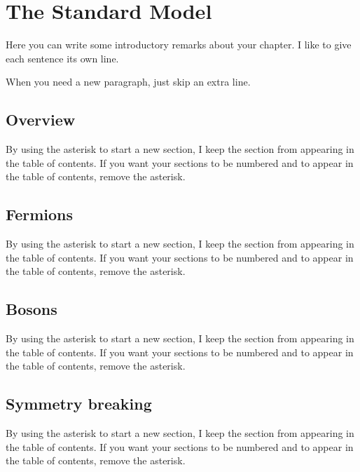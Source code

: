 

\chapter[The Standard Model][Top of Page Title]{The Standard Model}

Here you can write some introductory remarks about your chapter.
I like to give each sentence its own line.

When you need a new paragraph, just skip an extra line.

\section*{Overview}

By using the asterisk to start a new section, I keep the section from appearing in the table of contents.
If you want your sections to be numbered and to appear in the table of contents, remove the asterisk.


\section*{Fermions}

By using the asterisk to start a new section, I keep the section from appearing in the table of contents.
If you want your sections to be numbered and to appear in the table of contents, remove the asterisk.

\section*{Bosons}

By using the asterisk to start a new section, I keep the section from appearing in the table of contents.
If you want your sections to be numbered and to appear in the table of contents, remove the asterisk.

\section*{Symmetry breaking}

By using the asterisk to start a new section, I keep the section from appearing in the table of contents.
If you want your sections to be numbered and to appear in the table of contents, remove the asterisk.

